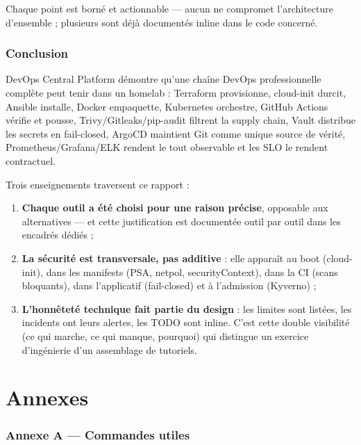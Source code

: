 \documentclass[12pt,a4paper]{article}
\begin{document}
Chaque point est borné et actionnable --- aucun ne compromet l'architecture d'ensemble ; plusieurs sont déjà documentés inline dans le code concerné.

\section{Conclusion}

DevOps Central Platform démontre qu'une chaîne DevOps professionnelle complète peut tenir dans un homelab : Terraform provisionne, cloud-init durcit, Ansible installe, Docker empaquette, Kubernetes orchestre, GitHub Actions vérifie et pousse, Trivy/Gitleaks/pip-audit filtrent la supply chain, Vault distribue les secrets en fail-closed, ArgoCD maintient Git comme unique source de vérité, Prometheus/Grafana/ELK rendent le tout observable et les SLO le rendent contractuel.

Trois enseignements traversent ce rapport :

\begin{enumerate}[itemsep=2pt]
  \item \textbf{Chaque outil a été choisi pour une raison précise}, opposable aux alternatives --- et cette justification est documentée outil par outil dans les encadrés dédiés ;
  \item \textbf{La sécurité est transversale, pas additive} : elle apparaît au boot (cloud-init), dans les manifests (PSA, netpol, securityContext), dans la CI (scans bloquants), dans l'applicatif (fail-closed) et à l'admission (Kyverno) ;
  \item \textbf{L'honnêteté technique fait partie du design} : les limites sont listées, les incidents ont leurs alertes, les TODO sont inline. C'est cette double visibilité (ce qui marche, ce qui manque, pourquoi) qui distingue un exercice d'ingénierie d'un assemblage de tutoriels.
\end{enumerate}

\clearpage
\part*{Annexes}

\section*{Annexe A --- Commandes utiles}
\end{document}
